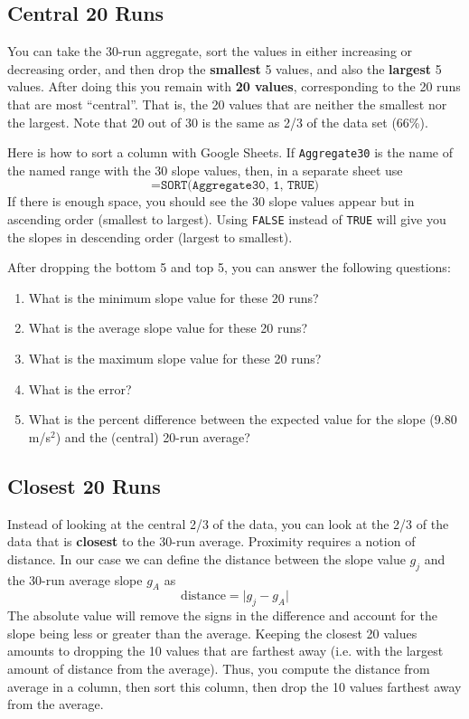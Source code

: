 \subsection{Central 20 Runs} \label{sec:01.central.20}
You can take the 30-run aggregate, sort the values in either increasing or decreasing order, and then drop the \textbf{smallest} 5 values, and also the \textbf{largest} 5 values. After doing this you remain with \textbf{20 values}, corresponding to the 20 runs that are most ``central''. That is, the 20 values that are neither the smallest nor the largest. Note that 20 out of 30 is the same as 2/3 of the data set (66\%).

Here is how to sort a column with Google Sheets. If \texttt{Aggregate30} is the name of the named range with the 30 slope values, then, in a separate sheet use
\begin{equation}
    \texttt{=SORT(Aggregate30, 1, TRUE)}
\end{equation}
If there is enough space, you should see the 30 slope values appear but in ascending order (smallest to largest). Using \texttt{FALSE} instead of \texttt{TRUE} will give you the slopes in descending order (largest to smallest).

After dropping the bottom 5 and top 5, you can answer the following questions:
\begin{enumerate}
    \item What is the minimum slope value for these 20 runs?
    \item What is the average slope value for these 20 runs?
    \item What is the maximum slope value for these 20 runs?
    \item What is the error?
    \item What is the percent difference between the expected value for the slope (9.80 m/s$^{2}$) and the (central) 20-run average?
\end{enumerate} 
\subsection{Closest 20 Runs} \label{sec:01.closest.20}
Instead of looking at the central 2/3 of the data, you can look at the 2/3 of the data that is \textbf{closest} to the 30-run average. Proximity requires a notion of distance. In our case we can define the distance between the slope value $g_{j}$ and the 30-run average slope $g_{A}$ as
\begin{equation}
    \text{distance} = \vert g_{j} - g_{A} \vert
\end{equation}
The absolute value will remove the signs in the difference and account for the slope being less or greater than the average. Keeping the closest 20 values amounts to dropping the 10 values that are farthest away (i.e. with the largest amount of distance from the average). Thus, you compute the distance from average in a column, then sort this column, then drop the 10 values farthest away from the average.

